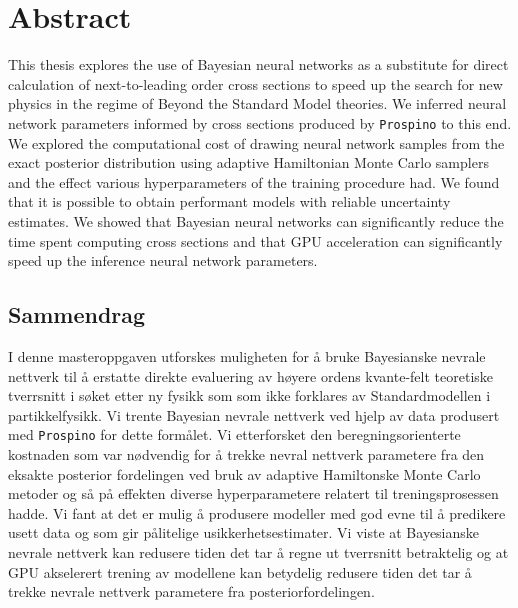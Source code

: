 \chapter*{Abstract}
This thesis explores the use of Bayesian neural networks as a substitute for direct calculation of next-to-leading order cross sections to speed up the search for new physics in the regime of Beyond the Standard Model theories.
We inferred neural network parameters informed by cross sections produced by {\tt Prospino} to this end.
We explored the computational cost of drawing neural network samples from the exact posterior distribution using adaptive Hamiltonian Monte Carlo samplers and the effect various hyperparameters of the training procedure had. We found that it is possible to obtain performant models with reliable uncertainty estimates. We showed that Bayesian neural networks can significantly reduce the time spent computing cross sections and that GPU acceleration can significantly speed up the inference neural network parameters.


\section*{Sammendrag}
I denne masteroppgaven utforskes muligheten for å bruke Bayesianske nevrale nettverk til å erstatte direkte evaluering av høyere ordens kvante-felt teoretiske tverrsnitt i søket etter ny fysikk som som ikke forklares av Standardmodellen i partikkelfysikk. 
Vi trente Bayesian nevrale nettverk ved hjelp av data produsert med {\tt Prospino} for dette formålet. 
Vi etterforsket den beregningsorienterte kostnaden som var nødvendig for å trekke nevral nettverk parametere fra den eksakte posterior fordelingen ved bruk av adaptive Hamiltonske Monte Carlo metoder og så på effekten diverse hyperparametere relatert til treningsprosessen hadde. Vi fant at det er mulig å produsere modeller med god evne til å predikere usett data og som gir pålitelige usikkerhetsestimater. Vi viste at Bayesianske nevrale nettverk kan redusere tiden det tar å regne ut tverrsnitt betraktelig og at GPU akselerert trening av modellene kan betydelig redusere tiden det tar å trekke nevrale nettverk parametere fra posteriorfordelingen.